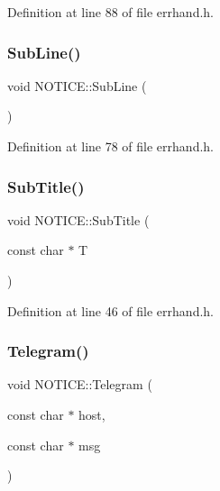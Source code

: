 Definition at line 88 of file errhand.\+h.

\mbox{\label{namespace_n_o_t_i_c_e_a782778073f9df89a3d20a7faa16494aa}} 
\subsubsection{\texorpdfstring{Sub\+Line()}{SubLine()}}
{\footnotesize\ttfamily void N\+O\+T\+I\+C\+E\+::\+Sub\+Line (\begin{DoxyParamCaption}{ }\end{DoxyParamCaption})\hspace{0.3cm}{\ttfamily [inline]}}



Definition at line 78 of file errhand.\+h.

\mbox{\label{namespace_n_o_t_i_c_e_a483b62c015a4211e2716f730ad2c0a44}} 
\subsubsection{\texorpdfstring{Sub\+Title()}{SubTitle()}}
{\footnotesize\ttfamily void N\+O\+T\+I\+C\+E\+::\+Sub\+Title (\begin{DoxyParamCaption}\item[{const char $\ast$}]{T }\end{DoxyParamCaption})\hspace{0.3cm}{\ttfamily [inline]}}



Definition at line 46 of file errhand.\+h.

\mbox{\label{namespace_n_o_t_i_c_e_a7f45e7bbaeb797160d77c7c5dbbb37a6}} 
\subsubsection{\texorpdfstring{Telegram()}{Telegram()}}
{\footnotesize\ttfamily void N\+O\+T\+I\+C\+E\+::\+Telegram (\begin{DoxyParamCaption}\item[{const char $\ast$}]{host,  }\item[{const char $\ast$}]{msg }\end{DoxyParamCaption})\hspace{0.3cm}{\ttfamily [inline]}}



